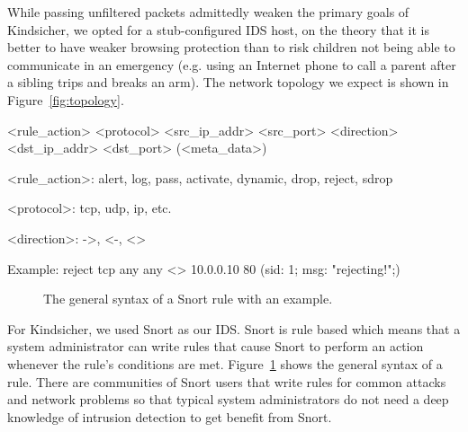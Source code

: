 While passing unfiltered packets admittedly weaken the primary goals of
Kindsicher, we opted for a stub-configured IDS host, on the theory that it is
better to have weaker browsing protection than to risk children not being able
to communicate in an emergency (e.g. using an Internet phone to call a parent
after a sibling trips and breaks an arm). The network topology we expect is
shown in Figure~\ref{fig:topology}.




\begin{verbbox}
<rule_action> <protocol>
    <src_ip_addr> <src_port>
    <direction>
    <dst_ip_addr> <dst_port>
    (<meta_data>)


<rule_action>: alert, log, pass, activate,
    dynamic, drop, reject, sdrop

<protocol>: tcp, udp, ip, etc.

<direction>: ->, <-, <>

Example:
reject tcp
    any any
    <>
    10.0.0.10 80
    (sid: 1; msg: "rejecting!";)

\end{verbbox}

\begin{figure}[!t]
    \centering
    \theverbbox
    \caption{The general syntax of a Snort rule with an example.}
    \label{fig:rule_syntax}
\end{figure}

For Kindsicher, we used Snort as our IDS.
%
Snort is rule based which means that a system administrator can write rules
that cause Snort to perform an action whenever the rule's conditions are met.
%
Figure~\ref{fig:rule_syntax} shows the general syntax of a rule. There are
communities of Snort users that write rules for common attacks and network
problems so that typical system administrators do not need a deep knowledge of
intrusion detection to get benefit from Snort.

